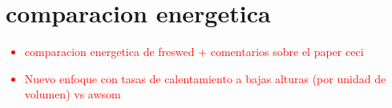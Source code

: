\chapter{comparacion energetica}
\textcolor{red}{
\begin{itemize}
  \item comparacion energetica de freswed + comentarios sobre el paper ceci
  \item Nuevo enfoque con tasas de calentamiento a bajas alturas (por unidad de volumen) vs awsom
\end{itemize}
}
